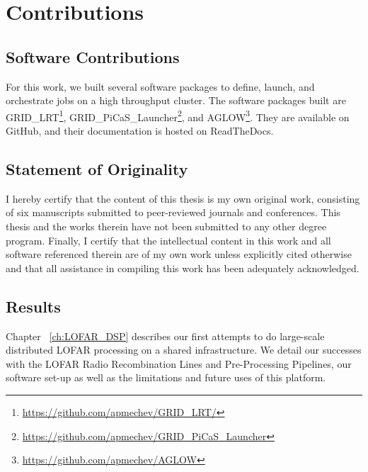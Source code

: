 \section{Contributions}



\subsection{Software Contributions}
 
For this work, we built several software packages to define, launch, and orchestrate jobs on a high throughput cluster. The software packages built are GRID\_LRT\footnote{\url{https://github.com/apmechev/GRID_LRT/}}, GRID\_PiCaS\_Launcher\footnote{\url{https://github.com/apmechev/GRID_PiCaS_Launcher}}, and AGLOW\footnote{\url{https://github.com/apmechev/AGLOW}}. They are available on GitHub, and their documentation is hosted on ReadTheDocs. 


\subsection{Statement of Originality}

I hereby certify that the content of this thesis is my own original work, consisting of six manuscripts submitted to peer-reviewed journals and conferences. This thesis and the works therein have not been submitted to any other degree program. Finally, I certify that the intellectual content in this work and all software referenced therein are of my own work unless explicitly cited otherwise and that all assistance in compiling this work has been adequately acknowledged.

\subsection{Results}

Chapter ~\ref{ch:LOFAR_DSP} describes our first attempts to do large-scale distributed LOFAR processing on a shared infrastructure. We detail our successes with the LOFAR Radio Recombination Lines and Pre-Processing Pipelines, our software set-up as well as the limitations and future uses of this platform.  


